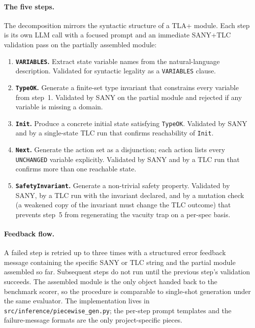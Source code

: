 \documentclass[11pt]{article}
\begin{document}
\paragraph{The five steps.} The decomposition mirrors the syntactic
structure of a TLA+ module. Each step is its own LLM call with a
focused prompt and an immediate SANY+TLC validation pass on the
partially assembled module:
\begin{enumerate}[leftmargin=1.4em, itemsep=2pt]
\item \textbf{\texttt{VARIABLES}.} Extract state variable names from
  the natural-language description. Validated for syntactic legality
  as a \texttt{VARIABLES} clause.
\item \textbf{\texttt{TypeOK}.} Generate a finite-set type invariant
  that constrains every variable from step~1. Validated by SANY on the
  partial module and rejected if any variable is missing a domain.
\item \textbf{\texttt{Init}.} Produce a concrete initial state
  satisfying \texttt{TypeOK}. Validated by SANY and by a single-state
  TLC run that confirms reachability of \texttt{Init}.
\item \textbf{\texttt{Next}.} Generate the action set as a disjunction;
  each action lists every \texttt{UNCHANGED} variable explicitly.
  Validated by SANY and by a TLC run that confirms more than one
  reachable state.
\item \textbf{\texttt{SafetyInvariant}.} Generate a non-trivial safety
  property. Validated by SANY, by a TLC run with the invariant
  declared, and by a mutation check (a weakened copy of the invariant
  must change the TLC outcome) that prevents step~5 from regenerating
  the vacuity trap on a per-spec basis.
\end{enumerate}

\paragraph{Feedback flow.} A failed step is retried up to three times
with a structured error feedback message containing the specific SANY
or TLC string and the partial module assembled so far. Subsequent steps
do not run until the previous step's validation succeeds. The
assembled module is the only object handed back to the benchmark
scorer, so the procedure is comparable to single-shot generation under
the same evaluator. The implementation lives in
\texttt{src/inference/piecewise\_gen.py}; the per-step prompt
templates and the failure-message formats are the only project-specific
pieces.
\end{document}
